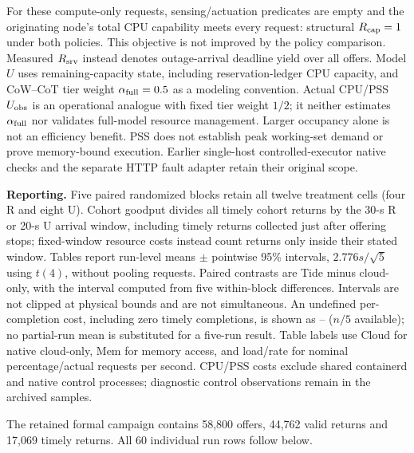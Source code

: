 For these compute-only requests, sensing/actuation predicates are empty and the originating node's total CPU capability meets every request: structural $R_{\rm cap}=1$ under both policies. This objective is not improved by the policy comparison. Measured $R_{\rm srv}$ instead denotes outage-arrival deadline yield over all offers. Model $U$ uses remaining-capacity state, including reservation-ledger CPU capacity, and CoW--CoT tier weight $\alpha_{\rm full}=0.5$ as a modeling convention. Actual CPU/PSS $U_{\rm obs}$ is an operational analogue with fixed tier weight $1/2$; it neither estimates $\alpha_{\rm full}$ nor validates full-model resource management. Larger occupancy alone is not an efficiency benefit. PSS does not establish peak working-set demand or prove memory-bound execution. Earlier single-host controlled-executor native checks and the separate HTTP fault adapter retain their original scope.

\noindent\textbf{Reporting.}
Five paired randomized blocks retain all twelve treatment cells (four R and eight U). Cohort goodput divides all timely cohort returns by the 30-s R or 20-s U arrival window, including timely returns collected just after offering stops; fixed-window resource costs instead count returns only inside their stated window. Tables report run-level means $\pm$ pointwise 95\% intervals, $2.776s/\sqrt{5}$ using $t(4)$, without pooling requests. Paired contrasts are Tide minus cloud-only, with the interval computed from five within-block differences. Intervals are not clipped at physical bounds and are not simultaneous. An undefined per-completion cost, including zero timely completions, is shown as -- ($n/5$ available); no partial-run mean is substituted for a five-run result. Table labels use Cloud for native cloud-only, Mem for memory access, and load/rate for nominal percentage/actual requests per second. CPU/PSS costs exclude shared containerd and native control processes; diagnostic control observations remain in the archived samples.

The retained formal campaign contains 58,800 offers, 44,762 valid returns and 17,069 timely returns. All 60 individual run rows follow below.

